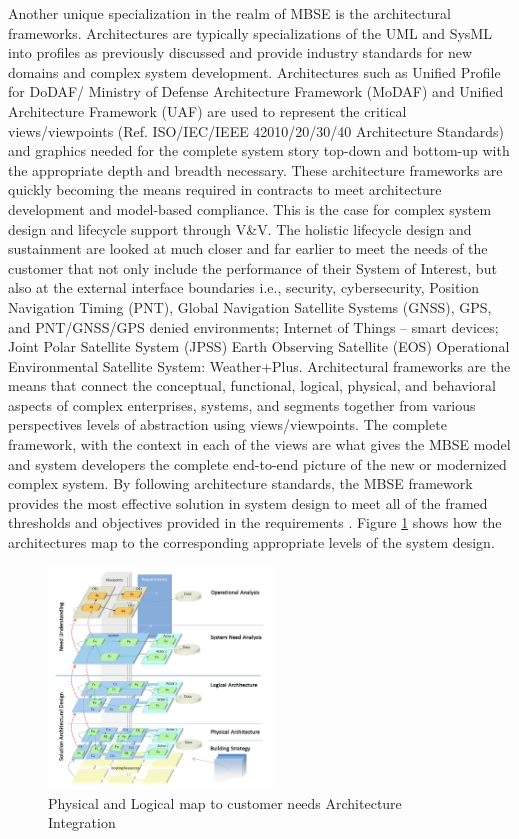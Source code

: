 \documentclass[num-refs]{wiley-article}
\begin{document}
Another unique specialization in the realm of MBSE is the architectural frameworks. Architectures are typically specializations of the UML and SysML into profiles as previously discussed and provide industry standards for new domains and complex system development. Architectures such as Unified Profile for DoDAF/ Ministry of Defense Architecture Framework (MoDAF) \cite{Stroud2016} and Unified Architecture Framework (UAF) are used to represent the critical views/viewpoints (Ref. ISO/IEC/IEEE 42010/20/30/40 Architecture Standards) \cite{Ieee420102011} and graphics needed for the complete system story top-down and bottom-up with the appropriate depth and breadth necessary. These architecture frameworks are quickly becoming the means required in contracts to meet architecture development and model-based compliance. This is the case for complex system design and lifecycle support through V\&V. The holistic lifecycle design and sustainment are looked at much closer and far earlier to meet the needs of the customer that not only include the performance of their System of Interest, but also at the external interface boundaries i.e., security, cybersecurity, Position Navigation Timing (PNT), Global Navigation Satellite Systems (GNSS), GPS, and PNT/GNSS/GPS denied environments; Internet of Things -- smart devices; Joint Polar Satellite System (JPSS) Earth Observing Satellite (EOS) Operational Environmental Satellite System: Weather+Plus. Architectural frameworks are the means that connect the conceptual, functional, logical, physical, and behavioral aspects of complex enterprises, systems, and segments together from various perspectives levels of abstraction using views/viewpoints. The complete framework, with the context in each of the views are what gives the MBSE model and system developers the complete end-to-end picture of the new or modernized complex system. By following architecture standards, the MBSE framework provides the most effective solution in system design to meet all of the framed thresholds and objectives provided in the requirements \cite{Manoir2019}. Figure \ref{fig3} shows how the architectures map to the corresponding appropriate levels of the system design.

\begin{figure}
\centering
\includegraphics[width=6cm]{Images/Capturephysicallogica.png}
\caption{Physical and Logical map to customer needs Architecture Integration \cite{Voirin2017}}
\label{fig3}
\end{figure}
\end{document}
